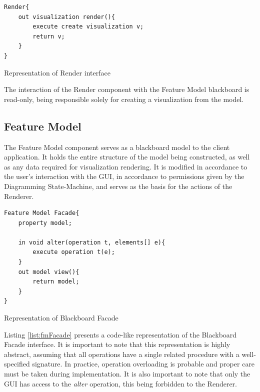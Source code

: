\begin{listing}
\begin{verbatim} 
Render{
    out visualization render(){
        execute create visualization v;
        return v;
    }
}
\end{verbatim}
\caption{Representation of Render interface}
\label{list:render}
\end{listing}

The interaction of the Render component with the Feature Model blackboard is read-only, being responsible solely for creating a visualization from the model.


\subsection{Feature Model}

The Feature Model component serves as a blackboard model to the client application. It holds the entire structure of the model being constructed, as well as any data required for visualization rendering. It is modified in accordance to the user's interaction with the GUI, in accordance to permissions given by the Diagramming State-Machine, and serves as the basis for the actions of the Renderer.

\begin{listing}
\begin{verbatim} 
Feature Model Facade{
    property model;

    in void alter(operation t, elements[] e){
        execute operation t(e);
    }
    out model view(){
        return model;
    }
}
\end{verbatim}
\caption{Representation of Blackboard Facade}
\label{list:fmFacade}
\end{listing}

Listing \ref{list:fmFacade} presents a code-like representation of the Blackboard Facade interface. It is important to note that this representation is highly abstract, assuming that all operations have a single related procedure with a well-specified signature. In practice, operation overloading is probable and proper care must be taken during implementation. It is also important to note that only the GUI has access to the \textit{alter} operation, this being forbidden to the Renderer.

